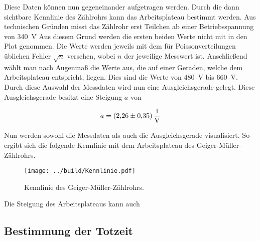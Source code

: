 \noindent Diese Daten können nun gegeneinander aufgetragen werden. Durch die dann sichtbare Kennlinie 
des Zählrohrs kann das Arbeitsplateau bestimmt werden. 
Aus technischen Gründen misst das Zählrohr erst Teilchen ab einer Betriebsspannung von \qty{340}{\volt} 
Aus diesem Grund werden die ersten beiden Werte nicht mit in den Plot genommen.
Die Werte werden jeweils mit dem für Poissonverteilungen üblichen Fehler $\sqrt{n}$ versehen, wobei $n$ 
der jeweilige Messwert ist.
Anschließend wählt man nach Augenmaß die Werte aus, die auf einer Geraden, welche dem Arbeitsplateau 
entspricht, liegen. Dies sind die Werte von \qty{480}{\volt} bis \qty{660}{\volt}. Durch diese Auswahl 
der Messdaten wird nun eine Ausgleichsgerade gelegt. Diese Ausgleichsgerade besitzt eine Steigung $a$ von

\begin{align}
    a = \qty{2.26\pm0.35}{\per \volt}
\end{align}

\noindent Nun werden sowohl die Messdaten als auch die Ausgleichsgerade visualisiert.
So ergibt sich die folgende Kennlinie mit dem Arbeitsplateau des Geiger-Müller-Zählrohrs.

\begin{figure}[H]
    \centering
    \texttt{[image: ../build/Kennlinie.pdf]}
    \caption{Kennlinie des Geiger-Müller-Zählrohrs.}
\end{figure}

\noindent Die Steigung des Arbeitsplateaus kann auch 


\subsection{Bestimmung der Totzeit}



